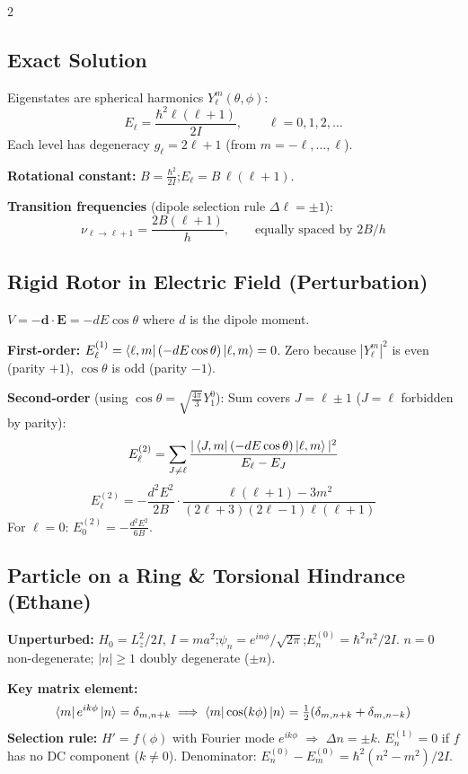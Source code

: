 \documentclass[9pt,a4paper]{article} %
\newcommand{\bs}[1]{\symbf{#1}}\usepackage{empheq}   %
\begin{document}
\begin{multicols}{2}
\subsection{Exact Solution}
Eigenstates are spherical harmonics $Y_\ell^m(\theta,\phi)$:
\[
\boxed{E_\ell = \frac{\hbar^2 \ell(\ell+1)}{2I}, \qquad \ell = 0,1,2,\ldots}
\]
Each level has degeneracy $g_\ell = 2\ell+1$ (from $m = -\ell,\ldots,\ell$).

\textbf{Rotational constant:} $B = \frac{\hbar^2}{2I}$;\quad $E_\ell = B\,\ell(\ell+1)$.

\textbf{Transition frequencies} (dipole selection rule $\Delta\ell = \pm 1$):
\[
\nu_{\ell \to \ell+1} = \frac{2B(\ell+1)}{h}, \qquad \text{equally spaced by } 2B/h
\]

\subsection{Rigid Rotor in Electric Field (Perturbation)}
$V = -\bs{d} \cdot \mathbf{E} = -dE\cos\theta$ where $d$ is the dipole moment.

\textbf{First-order:} $E_\ell^{(1)} = \bra{\ell,m}(-dE\cos\theta)\ket{\ell,m} = 0$.
Zero because $|Y_\ell^m|^2$ is even (parity $+1$), $\cos\theta$ is odd (parity $-1$).

\textbf{Second-order} (using $\cos\theta = \sqrt{\frac{4\pi}{3}}Y_1^0$):
Sum covers $J = \ell \pm 1$ ($J=\ell$ forbidden by parity):
\[
E_\ell^{(2)} = \sum_{J\ne \ell} \frac{|\bra{J,m}(-dE\cos\theta)\ket{\ell,m}|^2}{E_\ell - E_J}
\]
\[
E_\ell^{(2)} = -\frac{d^2 E^2}{2B} \cdot \frac{\ell(\ell+1) - 3m^2}{(2\ell+3)(2\ell-1)\ell(\ell+1)}
\]
For $\ell = 0$: $E_0^{(2)} = -\frac{d^2 E^2}{6B}$.
\subsection{Particle on a Ring \& Torsional Hindrance (Ethane)}

\textbf{Unperturbed:} $H_0 = L_z^2/2I$, $I=ma^2$;\quad $\psi_n=e^{in\phi}/\sqrt{2\pi}$;\quad $E_n^{(0)}=\hbar^2 n^2/2I$.
$n=0$ non-degenerate; $|n|\ge 1$ doubly degenerate ($\pm n$).

\textbf{Key matrix element:}
\[
\bra{m}e^{ik\phi}\ket{n}=\delta_{m,n+k} \implies \bra{m}\cos(k\phi)\ket{n}=\tfrac{1}{2}(\delta_{m,n+k}+\delta_{m,n-k})
\]
\textbf{Selection rule:} $H'=f(\phi)$ with Fourier mode $e^{ik\phi}$ $\Rightarrow$ $\Delta n=\pm k$.
$E_n^{(1)}=0$ if $f$ has no DC component ($k\ne0$). Denominator: $E_n^{(0)}-E_m^{(0)}=\hbar^2(n^2-m^2)/2I$.


\end{multicols}
\end{document}
